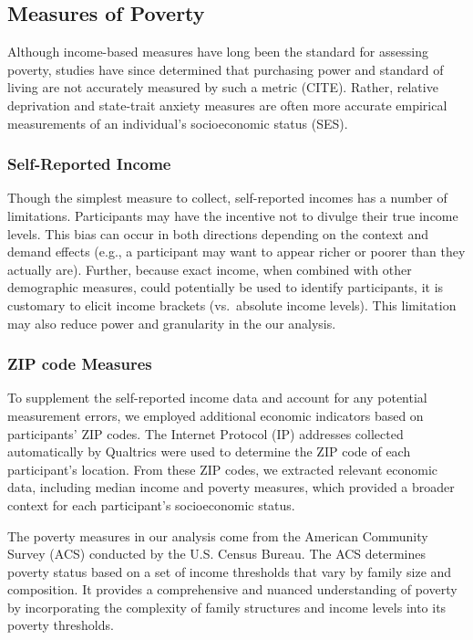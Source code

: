 \documentclass[
]{report}
\begin{document}
\hypertarget{measures-of-poverty}{%
\subsection{Measures of Poverty}\label{measures-of-poverty}}

Although income-based measures have long been the standard for assessing
poverty, studies have since determined that purchasing power and
standard of living are not accurately measured by such a metric (CITE).
Rather, relative deprivation and state-trait anxiety measures are often
more accurate empirical measurements of an individual's socioeconomic
status (SES).

\hypertarget{self-reported-income}{%
\subsubsection{Self-Reported Income}\label{self-reported-income}}

Though the simplest measure to collect, self-reported incomes has a
number of limitations. Participants may have the incentive not to
divulge their true income levels. This bias can occur in both directions
depending on the context and demand effects (e.g., a participant may
want to appear richer or poorer than they actually are). Further,
because exact income, when combined with other demographic measures,
could potentially be used to identify participants, it is customary to
elicit income brackets (vs.~absolute income levels). This limitation may
also reduce power and granularity in the our analysis.

\hypertarget{zip-code-measures}{%
\subsubsection{ZIP code Measures}\label{zip-code-measures}}

To supplement the self-reported income data and account for any
potential measurement errors, we employed additional economic indicators
based on participants' ZIP codes. The Internet Protocol (IP) addresses
collected automatically by Qualtrics were used to determine the ZIP code
of each participant's location. From these ZIP codes, we extracted
relevant economic data, including median income and poverty measures,
which provided a broader context for each participant's socioeconomic
status.

The poverty measures in our analysis come from the American Community
Survey (ACS) conducted by the U.S. Census Bureau. The ACS determines
poverty status based on a set of income thresholds that vary by family
size and composition. It provides a comprehensive and nuanced
understanding of poverty by incorporating the complexity of family
structures and income levels into its poverty thresholds.
\end{document}
